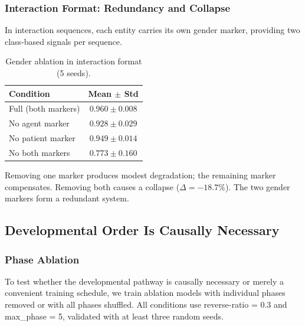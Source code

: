 \documentclass{article}
\begin{document}
\subsubsection{Interaction Format: Redundancy and Collapse}

In interaction sequences, each entity carries its own gender marker, providing two class-based signals per sequence.

\begin{table}[htbp]
\centering
\small
\begin{tabular}{lc}
\toprule
Condition & Mean $\pm$ Std \\
\midrule
Full (both markers) & $0.960 \pm 0.008$ \\
No agent marker & $0.928 \pm 0.029$ \\
No patient marker & $0.949 \pm 0.014$ \\
No both markers & $0.773 \pm 0.160$ \\
\bottomrule
\end{tabular}
\caption{Gender ablation in interaction format (5 seeds).}
\label{tab:genderablation}
\end{table}

Removing one marker produces modest degradation; the remaining marker compensates. Removing both causes a collapse ($\Delta = -18.7\%$). The two gender markers form a redundant system.

\subsection{Developmental Order Is Causally Necessary}

\subsubsection{Phase Ablation}

To test whether the developmental pathway is causally necessary or merely a convenient training schedule, we train ablation models with individual phases removed or with all phases shuffled. All conditions use reverse-ratio = 0.3 and max\_phase = 5, validated with at least three random seeds.
\end{document}
